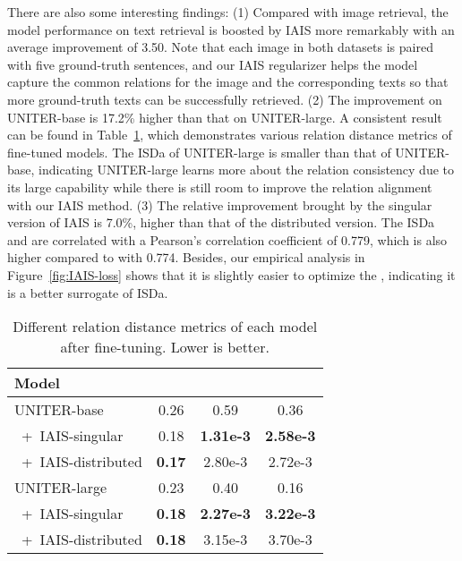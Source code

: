 \documentclass[11pt,a4paper]{article}
\begin{document}
There are also some interesting findings: 
(1) Compared with image retrieval, the model performance on text retrieval is boosted by IAIS more remarkably with an average improvement of 3.50.
Note that each image in both datasets is paired with five ground-truth sentences, and our IAIS regularizer helps the model capture the common relations for the image and the corresponding texts so that more ground-truth texts can be successfully retrieved.
(2) The improvement on UNITER-base is 17.2\% higher than that on UNITER-large. 
A consistent result can be found in Table~\ref{tb:ISD}, which demonstrates various relation distance metrics of fine-tuned models. 
The ISDa of UNITER-large is smaller than that of UNITER-base, indicating UNITER-large learns more about the relation consistency due to its large capability while there is still room to improve  the relation alignment with our IAIS method. 
(3) 
The relative improvement brought by the singular version of IAIS is 7.0\%, higher than that of the distributed version. 
The ISDa and  are correlated with a Pearson's correlation coefficient of 0.779, which is also higher compared to  with 0.774. 
Besides, our empirical analysis in Figure~\ref{fig:IAIS-loss} shows that it is slightly easier to optimize the , indicating it is a better surrogate of ISDa. 

\begin{table}[t]
\centering
\begin{adjustbox}{max width=0.38\textwidth}
\begin{tabular}{lccc}
\toprule
Model &           &                         &                         \\ \midrule
UNITER-base    & 0.26          & 0.59                        & 0.36                        \\
~+~IAIS-singular & 0.18          & \textbf{1.31e-3} & \textbf{2.58e-3} \\
~+~IAIS-distributed      & \textbf{0.17} & 2.80e-3 & 2.72e-3 \\ \midrule
UNITER-large   & 0.23          & 0.40                        & 0.16                        \\
~+~IAIS-singular & \textbf{0.18} & \textbf{2.27e-3} & \textbf{3.22e-3} \\
~+~IAIS-distributed      & \textbf{0.18} & 3.15e-3 & 3.70e-3 \\ \bottomrule
\end{tabular}
\end{adjustbox}
\label{ISD}
\caption{Different relation distance metrics of each model after fine-tuning. Lower is better.}
\label{tb:ISD}
\end{table} 
\end{document}
